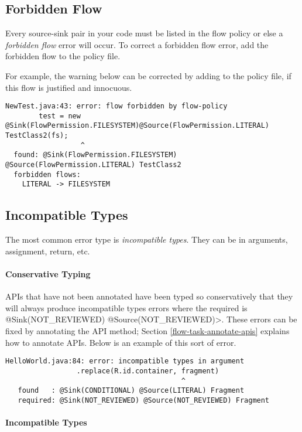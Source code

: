 \subsection{Forbidden Flow}  
Every source-sink pair in your code must be listed in the flow policy or else a \emph{forbidden flow} error will occur.
To correct a forbidden flow error, add the forbidden flow to the policy file. 
  
For example, the warning below can be corrected by adding   to the policy file, if this flow is justified and innocuous. 
\begin{Verbatim}
NewTest.java:43: error: flow forbidden by flow-policy  
        test = new @Sink(FlowPermission.FILESYSTEM)@Source(FlowPermission.LITERAL) TestClass2(fs);
                  ^
  found: @Sink(FlowPermission.FILESYSTEM) @Source(FlowPermission.LITERAL) TestClass2 
  forbidden flows:
    LITERAL -> FILESYSTEM
\end{Verbatim}

\subsection{Incompatible Types}
The most common error type is \emph{incompatible types}.  They can be in arguments,  assignment, return, etc.

\paragraph{Conservative Typing}

APIs that have not been annotated have been typed so conservatively that they will always produce incompatible types errors where the required is \<@Sink(NOT\_REVIEWED) @Source(NOT\_REVIEWED)>.  These errors can be fixed by annotating the API method; 
Section \ref{flow-task-annotate-apis} explains how to annotate APIs. 
Below is an example of this sort of error.

\begin{Verbatim}
HelloWorld.java:84: error: incompatible types in argument
                 .replace(R.id.container, fragment)
                                          ^
   found   : @Sink(CONDITIONAL) @Source(LITERAL) Fragment
   required: @Sink(NOT_REVIEWED) @Source(NOT_REVIEWED) Fragment
\end{Verbatim}

\paragraph{Incompatible Types}

